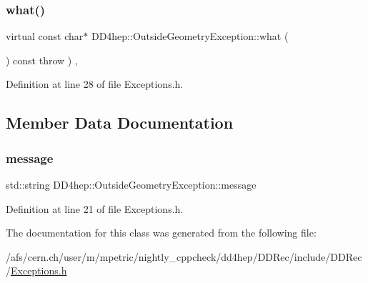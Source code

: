\subsubsection{\texorpdfstring{what()}{what()}}
{\footnotesize\ttfamily virtual const char$\ast$ D\+D4hep\+::\+Outside\+Geometry\+Exception\+::what (\begin{DoxyParamCaption}{ }\end{DoxyParamCaption}) const throw  ) \hspace{0.3cm}{\ttfamily [inline]}, {\ttfamily [virtual]}}



Definition at line 28 of file Exceptions.\+h.



\subsection{Member Data Documentation}
\hypertarget{class_d_d4hep_1_1_outside_geometry_exception_aaa768606a23c1acf432ffe83a76f0991}{}\label{class_d_d4hep_1_1_outside_geometry_exception_aaa768606a23c1acf432ffe83a76f0991} 
\subsubsection{\texorpdfstring{message}{message}}
{\footnotesize\ttfamily std\+::string D\+D4hep\+::\+Outside\+Geometry\+Exception\+::message\hspace{0.3cm}{\ttfamily [protected]}}



Definition at line 21 of file Exceptions.\+h.



The documentation for this class was generated from the following file\+:\begin{DoxyCompactItemize}
\item 
/afs/cern.\+ch/user/m/mpetric/nightly\+\_\+cppcheck/dd4hep/\+D\+D\+Rec/include/\+D\+D\+Rec/\hyperlink{_d_d_rec_2include_2_d_d_rec_2_exceptions_8h}{Exceptions.\+h}\end{DoxyCompactItemize}
